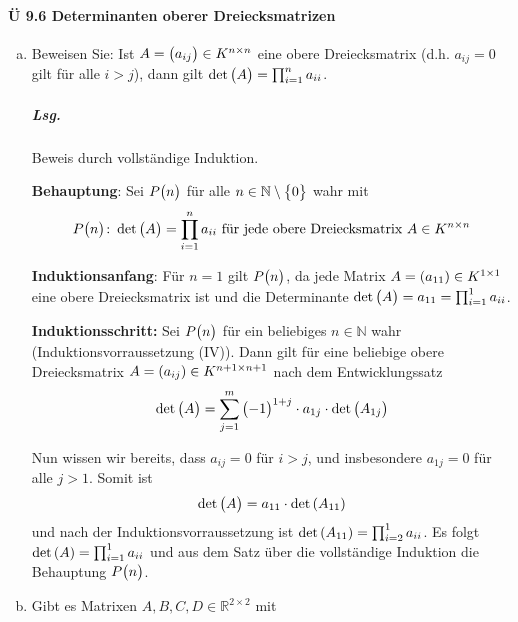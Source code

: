 \documentclass{scrreprt}
\begin{document}
\newpage
\paragraph{Ü 9.6 Determinanten oberer Dreiecksmatrizen}
\begin{enumerate}[(a)]
\item Beweisen Sie: Ist $A = \qty\big(a_{ij}) \in K^{n \times n}$ eine obere
  Dreiecksmatrix (d.h. $a_{ij} = 0$ gilt für alle $i > j$), dann gilt
  $\det\qty\big(A) = \prod_{i = 1}^n a_{ii}$.

  \subparagraph{Lsg.} Beweis durch vollständige Induktion.

  \textbf{Behauptung}: Sei $P\qty\big(n)$ für alle
  $n \in \mathbb{N} \setminus \qty\big{0}$ wahr mit
  \[
    P\qty\big(n) \colon \det\qty\big(A) = \prod_{i = 1}^n a_{ii}
    \text{ für jede obere Dreiecksmatrix } A \in K^{n \times n}
  \]

  \textbf{Induktionsanfang}: Für $n = 1$ gilt $P\qty\big(n)$, da jede Matrix
  $A = \qty(a_{11}) \in K^{1 \times 1}$ eine obere Dreiecksmatrix ist und die
  Determinante $\det\qty\big(A) = a_{11} = \prod_{i = 1}^1 a_{ii}$.

  \textbf{Induktionsschritt:} Sei $P\qty\big(n)$ für ein beliebiges
  $n \in \mathbb{N}$ wahr (Induktionsvorraussetzung (IV)).
  Dann gilt für eine beliebige obere Dreiecksmatrix
  $A = \qty(a_{ij}) \in K^{n + 1 \times n + 1}$ nach dem Entwicklungssatz
  \[
    \det\qty\big(A)
    = \sum_{j = 1}^m \qty\big(-1)^{1 + j} \cdot a_{1j} \cdot \det\qty\big(A_{1j})
  \]

  Nun wissen wir bereits, dass $a_{ij} = 0$ für $i > j$, und insbesondere
  $a_{1j} = 0$ für alle $j > 1$.
  Somit ist
  \[
    \det\qty\big(A) = a_{11} \cdot \det\qty(A_{11})
  \]
  und nach der Induktionsvorraussetzung ist
  $\det\qty(A_{11}) = \prod_{i = 2}^1 a_{ii}$.
  Es folgt $\det\qty(A) = \prod_{i = 1}^1 a_{ii}$ und aus dem Satz über die
  vollständige Induktion die Behauptung $P\qty\big(n)$.

\item Gibt es Matrixen $A, B, C, D \in \mathbb{R}^{2 \times 2}$ mit


\end{enumerate}
\end{document}
